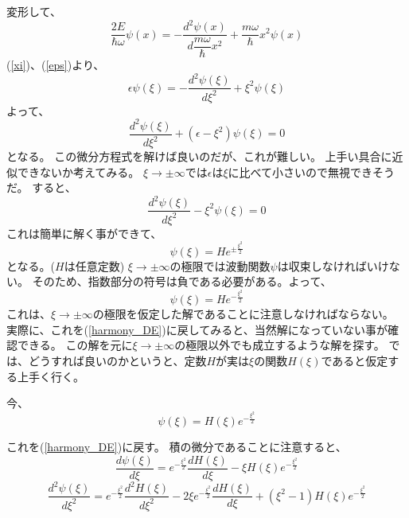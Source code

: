 変形して、
\begin{equation}
	\dfrac{2E}{\hbar\omega}\psi(x) = - \dfrac{d^2 \psi(x)}{d \dfrac{m\omega}{\hbar} x^2} + \dfrac{m\omega}{\hbar} x^2\psi(x)
\end{equation}
(\ref{xi})、(\ref{eps})より、
\begin{equation}
	\epsilon\psi(\xi) = - \dfrac{d^2 \psi(\xi)}{d \xi^2} + \xi^2\psi(\xi)
\end{equation}
よって、
\begin{equation}
	\label{harmony_DE}
	\dfrac{d^2 \psi(\xi)}{d \xi^2} + (\epsilon - \xi^2)\psi(\xi) = 0
\end{equation}
となる。
この微分方程式を解けば良いのだが、これが難しい。
上手い具合に近似できないか考えてみる。
$\xi \to \pm \infty$では$\epsilon$は$\xi$に比べて小さいので無視できそうだ。
すると、
\begin{equation}
	\dfrac{d^2 \psi(\xi)}{d \xi^2}  - \xi^2\psi(\xi) = 0
\end{equation}
これは簡単に解く事ができて、
\begin{equation}
	\psi(\xi) = He^{\pm \frac{\xi^2}{2}}
\end{equation}
となる。($H$は任意定数)
$\xi \to \pm\infty$の極限では波動関数$\psi$は収束しなければいけない。
そのため、指数部分の符号は負である必要がある。よって、
\begin{equation}
	\psi(\xi) = He^{-\frac{\xi^2}{2}}
\end{equation}
これは、$\xi \to \pm \infty$の極限を仮定した解であることに注意しなければならない。
実際に、これを(\ref{harmony_DE})に戻してみると、当然解になっていない事が確認できる。
この解を元に$\xi \to \pm \infty$の極限以外でも成立するような解を探す。
では、どうすれば良いのかというと、定数$H$が実は$\xi$の関数$H(\xi)$であると仮定する上手く行く。

今、
\begin{equation}
	\psi(\xi) = H(\xi)e^{-\frac{\xi^2}{2}}
\end{equation}

これを(\ref{harmony_DE})に戻す。
積の微分であることに注意すると、
\begin{equation}
	\dfrac{d\psi(\xi)}{d\xi} = e^{-\frac{\xi^2}{2}}\dfrac{dH(\xi)}{d\xi} - \xi H(\xi)e^{-\frac{\xi^2}{2}}
\end{equation}
\begin{equation}
	\dfrac{d^2\psi(\xi)}{d\xi^2} = e^{-\frac{\xi^2}{2}}\dfrac{d^2 H(\xi)}{d\xi^2} -2\xi e^{-\frac{\xi^2}{2}}\dfrac{dH(\xi)}{d\xi}
	 															+ (\xi^2 - 1)H(\xi)e^{-\frac{\xi^2}{2}}
\end{equation}

